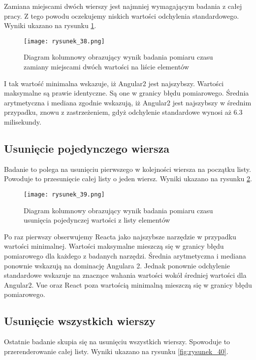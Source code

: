 Zamiana miejscami dwóch wierszy jest najmniej wymagającym badania z całej pracy. Z tego powodu oczekujemy niskich wartości odchylenia standardowego. Wyniki ukazano na rysunku \ref{fig:rysunek_38}.

\begin{figure}[htbp]
    \centering
    \texttt{[image: rysunek\_38.png]}
    \caption{Diagram kolumnowy obrazujący wynik badania pomiaru czasu zamiany miejscami dwóch wartości na liście elementów}
    \label{fig:rysunek_38}
\end{figure}

I tak wartość minimalna wskazuje, iż Angular2 jest najszybszy. Wartości maksymalne są prawie identyczne.
Są one w granicy błędu pomiarowego. Średnia arytmetyczna i mediana zgodnie wskazują, iż Angular2 jest najszybszy w średnim przypadku, znowu z zastrzeżeniem, gdyż odchylenie standardowe wynosi aż 6.3 milisekundy.

\clearpage
\subsection{Usunięcie pojedynczego wiersza}

Badanie to polega na usunięciu pierwszego w kolejności wiersza na początku listy. Powoduje to przesunięcie całej listy o jeden wiersz. Wyniki ukazano na rysunku \ref{fig:rysunek_39}.

\begin{figure}[htbp]
    \centering
    \texttt{[image: rysunek\_39.png]}
    \caption{Diagram kolumnowy obrazujący wynik badania pomiaru czasu usunięcia pojedynczej wartości z listy elementów}
    \label{fig:rysunek_39}
\end{figure}

Po raz pierwszy obserwujemy Reacta jako najszybsze narzędzie w przypadku wartości minimalnej.
Wartości maksymalne mieszczą się w granicy błędu pomiarowego dla każdego z badanych narzędzi. Średnia arytmetyczna i mediana ponownie wskazują na dominację Angulara 2.
Jednak ponownie odchylenie standardowe wskazuje na znaczące wahania wartości wokół średniej wartości dla Angular2.
Vue oraz React poza wartością minimalną mieszczą się w granicy błędu pomiarowego.

\clearpage
\subsection{Usunięcie wszystkich wierszy}

Ostatnie badanie skupia się na usunięciu wszystkich wierszy. Spowoduje to przerenderowanie całej listy. Wyniki ukazano na rysunku \ref{fig:rysunek_40}. 

